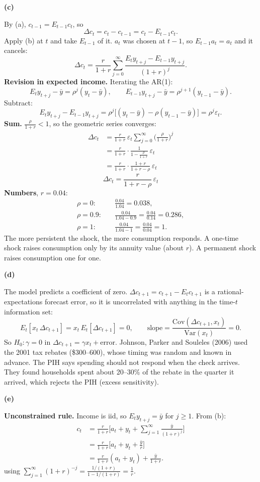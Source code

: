 \documentclass[12pt]{article}
\newcommand{\E}{E}
\newcommand{\pt}[1]{\par\bigskip\textbf{(#1)}\par}
\newcommand{\ans}[1]{\[\boxed{\ #1\ }\]}
\begin{document}
\pt{c}
By (a), $c_{t-1}=\E_{t-1}c_t$, so
\[
\Delta c_t=c_t-c_{t-1}=c_t-\E_{t-1}c_t .
\]
Apply (b) at $t$ and take $\E_{t-1}$ of it. $a_t$ was chosen at $t-1$, so
$\E_{t-1}a_t=a_t$ and it cancels:
\[
\Delta c_t=\frac{r}{1+r}\sum_{j=0}^\infty\frac{\E_ty_{t+j}-\E_{t-1}y_{t+j}}{(1+r)^j}.
\]
\textbf{Revision in expected income.} Iterating the AR(1):
\[
\E_ty_{t+j}-\bar y=\rho^j(y_t-\bar y),\qquad\E_{t-1}y_{t+j}-\bar y=\rho^{j+1}(y_{t-1}-\bar y).
\]
Subtract:
\[
\E_ty_{t+j}-\E_{t-1}y_{t+j}=\rho^j\big[(y_t-\bar y)-\rho(y_{t-1}-\bar y)\big]=\rho^j\varepsilon_t .
\]
\textbf{Sum.} $\frac{\rho}{1+r}<1$, so the geometric series converges:
\begin{align*}
\Delta c_t&=\frac{r}{1+r}\,\varepsilon_t\sum_{j=0}^\infty\Big(\frac{\rho}{1+r}\Big)^j\\
&=\frac{r}{1+r}\cdot\frac{1}{1-\frac{\rho}{1+r}}\,\varepsilon_t\\
&=\frac{r}{1+r}\cdot\frac{1+r}{1+r-\rho}\,\varepsilon_t
\end{align*}
\ans{\Delta c_t=\frac{r}{1+r-\rho}\,\varepsilon_t}
\textbf{Numbers}, $r=0.04$:
\begin{align*}
\rho=0:&\quad\frac{0.04}{1.04}=0.038,\\
\rho=0.9:&\quad\frac{0.04}{1.04-0.9}=\frac{0.04}{0.14}=0.286,\\
\rho=1:&\quad\frac{0.04}{1.04-1}=\frac{0.04}{0.04}=1 .
\end{align*}
The more persistent the shock, the more consumption responds. A one-time
shock raises consumption only by its annuity value (about $r$). A
permanent shock raises consumption one for one.

\pt{d}
The model predicts a coefficient of zero. $\Delta c_{t+1}=c_{t+1}-\E_tc_{t+1}$
is a rational-expectations forecast error, so it is uncorrelated with
anything in the time-$t$ information set:
\[
\E_t[x_t\,\Delta c_{t+1}]=x_t\,\E_t[\Delta c_{t+1}]=0,\qquad\text{slope}=\frac{\mathrm{Cov}(\Delta c_{t+1},x_t)}{\mathrm{Var}(x_t)}=0 .
\]
So $H_0:\gamma=0$ in $\Delta c_{t+1}=\gamma x_t+\text{error}$.
Johnson, Parker and Souleles (2006) used the 2001 tax rebates (\$300--600),
whose timing was random and known in advance. The PIH says spending should
not respond when the check arrives. They found households spent about
20--30\% of the rebate in the quarter it arrived, which rejects the PIH
(excess sensitivity).

\pt{e}
\textbf{Unconstrained rule.} Income is iid, so $\E_ty_{t+j}=\bar y$ for
$j\ge1$. From (b):
\begin{align*}
c_t&=\frac{r}{1+r}\Big[a_t+y_t+\sum_{j=1}^\infty\frac{\bar y}{(1+r)^j}\Big]\\
&=\frac{r}{1+r}\Big[a_t+y_t+\frac{\bar y}{r}\Big]\\
&=\frac{r}{1+r}(a_t+y_t)+\frac{\bar y}{1+r}.
\end{align*}
using $\sum_{j=1}^\infty(1+r)^{-j}=\frac{1/(1+r)}{1-1/(1+r)}=\frac1r$.
\end{document}
